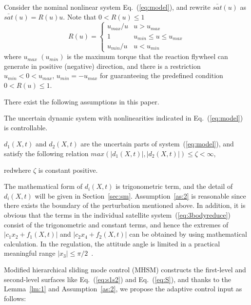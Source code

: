 Consider the nominal nonlinear system Eq.~(\ref{eq:model}), and rewrite $\bar{sat}(u)$ as $\bar{sat}(u) = R(u)u$. Note that $0 < R(u) \le 1$
\begin{equation}
R(u) =\begin{cases}
u_{max}/u   & u > u_{max}\\
1           & u_{min} \le u \le u_{max}\\
u_{min}/u   & u < u_{min}
\end{cases}
\end{equation}
where $u_{max}$ $(u_{min})$ is the maximum torque that the reaction flywheel can generate in positive (negative) direction, and there is a restriction $u_{min}<0<u_{max}$, $u_{min}=-u_{max}$ for guaranteeing the predefined condition $0<R(u)\le 1$.\par
There exist the following assumptions in this paper.
\begin{assumption}
The uncertain dynamic system with nonlinearities indicated in Eq.~(\ref{eq:model}) is controllable.\label{as:1}
\end{assumption}
\begin{assumption}
$d_1(X,t)$ and $d_2(X,t)$ are the uncertain parts of system~(\ref{eq:model}), and satisfy the following relation $max(\vert d_1(X,t)\vert,\vert d_2(X,t)\vert) \le \zeta <\infty$, \begin{color}{red}where $\zeta$ is constant positive.\end{color}\label{as:2}
\end{assumption}
\begin{remark}
The mathematical form of $d_i(X,t)$ is trigonometric term, and the detail of $d_i(X,t)$ will be given in Section~\ref{sec:sm}. Assumption~\ref{as:2} is reasonable since there exists the boundary of the perturbation mentioned above. In addition, it is obvious that the terms in the individual satellite system~(\ref{eq:3bodyreduce}) consist of the trigonometric and constant terms, and hence the extremes of $\vert c_1x_2+f_1(X,t)\vert$ and $\vert c_2x_4+f_2(X,t)\vert$ can be obtained by using mathematical calculation. In the regulation, the attitude angle is limited in a practical meaningful range $\vert x_3\vert\le\pi/2$~\cite{chung2008propellant2}.
\end{remark}\par
Modified hierarchical sliding mode control (MHSM) constructs the first-level and second-level surfaces like Eq.~(\ref{eq:s1s2}) and Eq.~(\ref{eq:S}), and thanks to the Lemma~\ref{lm:1} and Assumption~\ref{as:2}, we propose the adaptive control input as follows:
